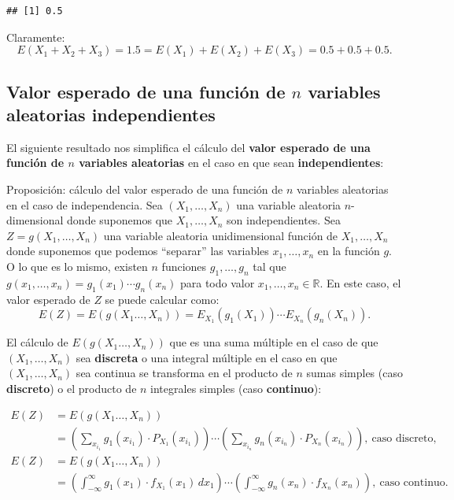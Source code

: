 \documentclass[]{book}
\begin{document}
\begin{verbatim}
## [1] 0.5
\end{verbatim}

Claramente:
\[
E(X_1+X_2+X_3)=1.5=E(X_1)+E(X_2)+E(X_3)=0.5+0.5+0.5.
\]

\hypertarget{valor-esperado-de-una-funciuxf3n-de-n-variables-aleatorias-independientes}{%
\subsection{\texorpdfstring{Valor esperado de una función de \(n\) variables aleatorias independientes}{Valor esperado de una función de n variables aleatorias independientes}}\label{valor-esperado-de-una-funciuxf3n-de-n-variables-aleatorias-independientes}}

El siguiente resultado nos simplifica el cálculo del \textbf{valor esperado de una función de \(n\) variables aleatorias} en el caso en que sean \textbf{independientes}:

Proposición: cálculo del valor esperado de una función de \(n\) variables aleatorias en el caso de independencia.
Sea \((X_1,\ldots,X_n)\) una variable aleatoria \(n\)-dimensional donde suponemos que \(X_1,\ldots,X_n\) son independientes.
Sea \(Z=g(X_1,\ldots,X_n)\) una variable aleatoria unidimensional función de \(X_1,\ldots,X_n\) donde suponemos que podemos ``separar'' las variables \(x_1,\ldots, x_n\) en la función \(g\). O lo que es lo mismo, existen \(n\) funciones \(g_1,\ldots, g_n\) tal que \(g(x_1,\ldots,x_n)=g_1(x_1)\cdots g_n(x_n)\) para todo valor \(x_1,\ldots,x_n\in\mathbb{R}\). En este caso, el valor esperado de \(Z\) se puede calcular como:
\[
E(Z)=E(g(X_1\ldots,X_n))=E_{X_1}(g_1(X_1))\cdots E_{X_n}(g_n(X_n)).
\]

El cálculo de \(E(g(X_1\ldots,X_n))\) que es una suma múltiple en el caso de que \((X_1,\ldots,X_n)\) sea \textbf{discreta} o una integral múltiple en el caso en que \((X_1,\ldots,X_n)\) sea continua se transforma en el producto de \(n\) sumas simples (caso \textbf{discreto}) o el producto de \(n\) integrales simples (caso \textbf{continuo}):

\[
\begin{array}{rl}
E(Z) & =E(g(X_1\ldots,X_n))\\ & =\left(\sum_{x_{i_1}} g_1(x_{i_1})\cdot P_{X_1}(x_{i_1})\right)\cdots \left(\sum_{x_{i_n}} g_n(x_{i_n})\cdot P_{X_n}(x_{i_n})\right), \ \mbox{caso discreto},\\
E(Z) & =E(g(X_1\ldots,X_n)) \\ & =\left(\int_{-\infty}^\infty g_1(x_1)\cdot f_{X_1}(x_1)\, dx_1\right)\cdots \left(\int_{-\infty}^\infty g_n(x_n)\cdot f_{X_n}(x_n)\right), \ \mbox{caso continuo}.
\end{array}
\]
\end{document}
